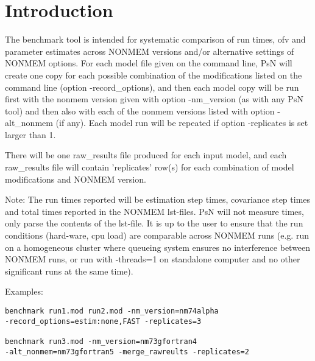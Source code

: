 

\usepackage{hyperref}


\maketitle
\newcommand{\guidetoolname}{benchmark}
\tableofcontents
\newpage

\section{Introduction}
The benchmark tool is intended for systematic comparison of run times, ofv and parameter estimates
across NONMEM versions and/or alternative settings of NONMEM options.
For each model file given on the command line, PsN will create one copy for each possible combination
of the modifications listed on the command line (option -record\_options), and
then each model copy will be run first with the nonmem version given
with option -nm\_version (as with any PsN tool) and then also with
each of the nonmem versions listed with option -alt\_nonmem (if any).
Each model run will be repeated if option -replicates is set larger than 1.

There will be one raw\_results file produced for each input model, and each raw\_results file will contain 
'replicates' row(s)
for each combination of model modifications and NONMEM version. 

Note: The run times reported will be estimation step times, covariance step times and total times reported in the NONMEM lst-files.
PsN will not measure times, only parse the contents of the lst-file. It is up to the user to ensure that the run conditions 
(hard-ware, cpu load) are comparable across NONMEM runs (e.g. run on a homogeneous cluster where queueing system ensures 
no interference between NONMEM runs, or run with -threads=1 on standalone computer and no other significant runs at the same time).

Examples:
\begin{verbatim}
benchmark run1.mod run2.mod -nm_version=nm74alpha 
-record_options=estim:none,FAST -replicates=3

benchmark run3.mod -nm_version=nm73gfortran4 
-alt_nonmem=nm73gfortran5 -merge_rawreults -replicates=2
\end{verbatim}

